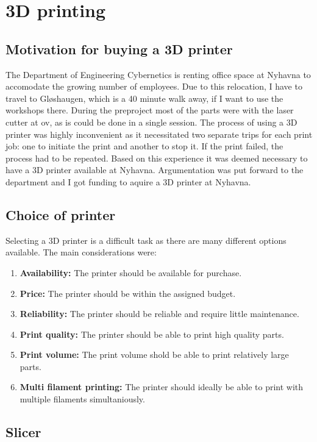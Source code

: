 \section{3D printing}

\subsection{Motivation for buying a 3D printer}
The Department of Engineering Cybernetics is renting office space at Nyhavna to accomodate the growing number of employees.
Due to this relocation, I have to travel to Gløshaugen, which is a 40 minute walk away, if I want to use the workshops there.
During the preproject most of the parts were with the laser cutter at \gls{ov}, as is could be done in a single session.
The process of using a 3D printer was highly inconvenient as it necessitated two separate trips for each print job: one to initiate the print and another to stop it.
If the print failed, the process had to be repeated.
Based on this experience it was deemed necessary to have a 3D printer available at Nyhavna.
Argumentation was put forward to the department and I got funding to aquire a 3D printer at Nyhavna.

\subsection{Choice of printer}
Selecting a 3D printer is a difficult task as there are many different options available.
The main considerations were:
\begin{enumerate}
    \item \textbf{Availability:} The printer should be available for purchase.
    \item \textbf{Price:} The printer should be within the assigned budget.
    \item \textbf{Reliability:} The printer should be reliable and require little maintenance.
    \item \textbf{Print quality:} The printer should be able to print high quality parts.
    \item \textbf{Print volume:} The print volume shold be able to print relatively large parts.
    \item \textbf{Multi filament printing:} The printer should ideally be able to print with multiple filaments simultaniously.
\end{enumerate}



\subsection{Slicer}



